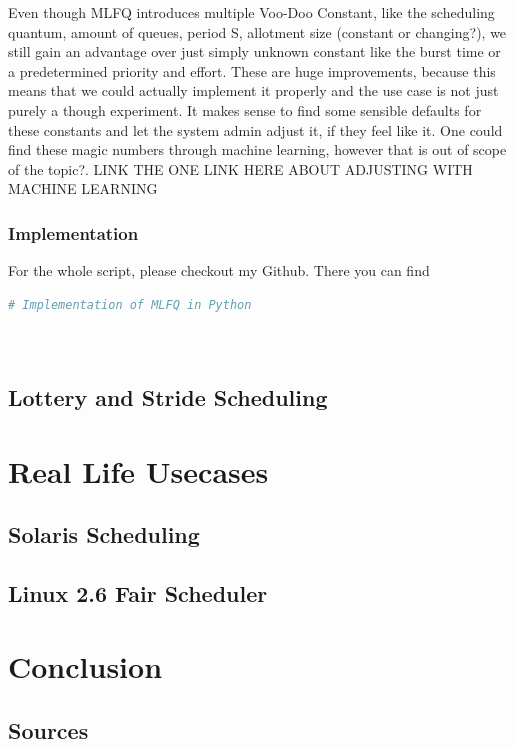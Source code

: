 \documentclass{report}
\begin{document}
Even though MLFQ introduces multiple Voo-Doo Constant, like the scheduling quantum, amount of queues, period S, allotment size (constant or changing?), we still gain an advantage over just simply unknown constant like the burst time or a predetermined priority and effort. These are huge improvements, because this means that we could actually implement it properly and the use case is not just purely a though experiment. 
It makes sense to find some sensible defaults for these constants and let the system admin adjust it, if they feel like it. One could find these magic numbers through machine learning, however that is out of scope of the topic?.
LINK THE ONE LINK HERE ABOUT ADJUSTING WITH MACHINE LEARNING

\section{Implementation}

For the whole script, please checkout my Github. There you can find

\begin{lstlisting}[language=Python, style=colorEX]
    # Implementation of MLFQ in Python
    
  
  \end{lstlisting}

\chapter{Lottery and Stride Scheduling}

\part{Real Life Usecases}

\chapter{Solaris Scheduling}

\chapter{Linux 2.6 Fair Scheduler}



\part{Conclusion}

\chapter*{Sources}
\end{document}
